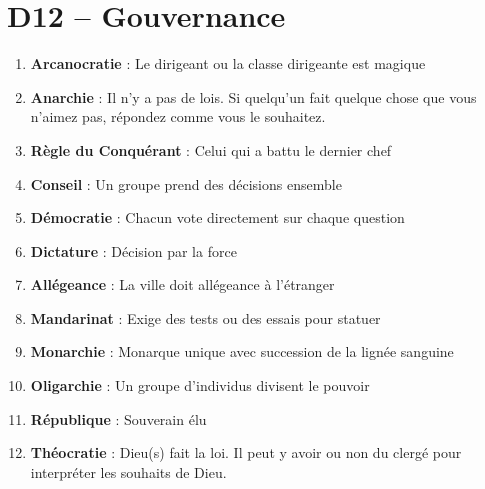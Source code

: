 \documentclass{article}
\begin{document}
\section*{D12 -- Gouvernance}
\begin{enumerate}
	\item \textbf{Arcanocratie} : Le dirigeant ou la classe dirigeante est magique
	\item \textbf{Anarchie} : Il n'y a pas de lois. Si quelqu'un fait quelque chose que vous n'aimez pas, répondez comme vous le souhaitez.
	\item \textbf{Règle du Conquérant} : Celui qui a battu le dernier chef
	\item \textbf{Conseil} : Un groupe prend des décisions ensemble
	\item \textbf{Démocratie} : Chacun vote directement sur chaque question
	\item \textbf{Dictature} : Décision par la force
	\item \textbf{Allégeance} : La ville doit allégeance à l'étranger
	\item \textbf{Mandarinat} : Exige des tests ou des essais pour statuer
	\item \textbf{Monarchie} : Monarque unique avec succession de la lignée sanguine
	\item \textbf{Oligarchie} : Un groupe d'individus divisent le pouvoir
	\item \textbf{République} : Souverain élu
	\item \textbf{Théocratie} : Dieu(s) fait la loi. Il peut y avoir ou non du clergé pour interpréter les souhaits de Dieu.
\end{enumerate}
\end{document}
